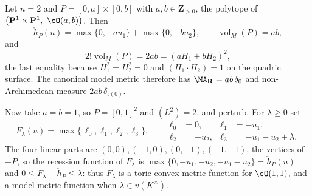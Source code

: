 \begin{example}
\label{ex:ch08-toric-p1p1}
Let $n=2$ and $P=[0,a]\times[0,b]$ with $a,b\in\mathbf Z_{>0}$, the polytope
of $\bigl(\mathbf P^1\times\mathbf P^1,\ \cO(a,b)\bigr)$.  Then
\[
 \check h_P(u)=\max\{0,-au_1\}+\max\{0,-bu_2\},
 \qquad
 \operatorname{vol}_M(P)=ab ,
\]
and
\[
 2!\operatorname{vol}_M(P)=2ab=(aH_1+bH_2)^2 ,
\]
the last equality because $H_1^2=H_2^2=0$ and $(H_1\cdot H_2)=1$ on the
quadric surface.  The canonical model metric therefore has
$\MA_{\mathbf R}=ab\,\delta_0$ and non-Archimedean measure
$2ab\,\delta_{\iota(0)}$.

Now take $a=b=1$, so $P=[0,1]^2$ and $(L^2)=2$, and perturb.  For
$\lambda\geq0$ set
\[
 F_\lambda(u)=\max\{\,\ell_0,\ell_1,\ell_2,\ell_3\},
 \qquad
 \begin{aligned}
  \ell_0&=0, &\ell_1&=-u_1,\\
  \ell_2&=-u_2, &\ell_3&=-u_1-u_2+\lambda .
 \end{aligned}
\]
The four linear parts are $(0,0),(-1,0),(0,-1),(-1,-1)$, the vertices of
$-P$, so the recession function of $F_\lambda$ is
$\max\{0,-u_1,-u_2,-u_1-u_2\}=\check h_P(u)$ and
$0\leq F_\lambda-\check h_P\leq\lambda$: thus $F_\lambda$ is a toric convex
metric function for $\cO(1,1)$, and a model metric function when
$\lambda\in v(K^\times)$.


\end{example}
